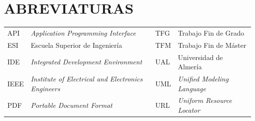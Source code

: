 


\setcounter{secnumdepth}{3} %
\setcounter{tocdepth}{3} %



\tableofcontents
\listoffigures %
\listoftables %
\lstlistoflistings %





\clearpage
\vspace{0.2cm}
\section*{ABREVIATURAS}
\noindent
\begin{tabularx}{\textwidth}{|Y{0.4600}|Y{1.5400}|Y{0.4600}|Y{1.5400}|}
\hline
API & \textit{Application Programming Interface} & TFG & Trabajo Fin de Grado \\
ESI & Escuela Superior de Ingeniería & TFM & Trabajo Fin de Máster \\
IDE & \textit{Integrated Development Environment} & UAL & Universidad de Almería \\
IEEE & \textit{Institute of Electrical and Electronics Engineers} & UML & \textit{Unified Modeling Language} \\
PDF & \textit{Portable Document Format} & URL & \textit{Uniform Resource Locator} \\
\hline
\end{tabularx}

